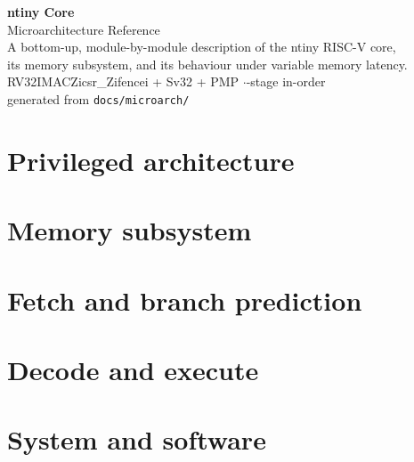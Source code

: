 \documentclass[11pt,a4paper]{article}
\begin{document}
\begin{titlepage}
\centering\vspace*{3cm}
{\Huge\bfseries\color{accent} ntiny Core}\\[0.4cm]
{\LARGE Microarchitecture Reference}\\[1.5cm]
{\large A bottom-up, module-by-module description of the ntiny RISC-V core,}\\
{\large its memory subsystem, and its behaviour under variable memory latency.}\\[2cm]
{\large\color{muted} RV32IMACZicsr\_Zifencei + Sv32 + PMP \quad$\cdot$-stage in-order}\\[0.3cm]
{\color{muted} generated from \texttt{docs/microarch/}}
\vfill
\end{titlepage}

\tableofcontents
\clearpage


\clearpage
\part{Privileged architecture}

\clearpage

\clearpage

\clearpage
\part{Memory subsystem}

\clearpage

\clearpage

\clearpage

\clearpage

\clearpage
\part{Fetch and branch prediction}

\clearpage

\clearpage

\clearpage
\part{Decode and execute}

\clearpage
\part{System and software}

\clearpage

\end{document}
